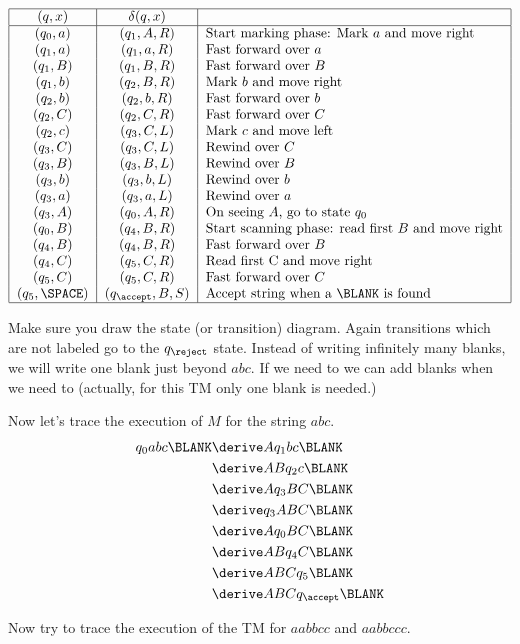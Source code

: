 \begin{eg}
\[
\begin{tabular}{|c|c|l|}
  \hline
  $(q,x)$ & $\delta(q,x)$ & \mbox{} \\
  \hline
  $(q_0,a)$ & $(q_1,A,R)$ & Start marking phase: Mark $a$ and move right \\
  $(q_1,a)$ & $(q_1,a,R)$ & Fast forward over $a$ \\
  $(q_1,B)$ & $(q_1,B,R)$ & Fast forward over $B$ \\
  $(q_1,b)$ & $(q_2,B,R)$ & Mark $b$ and move right \\
  $(q_2,b)$ & $(q_2,b,R)$ & Fast forward over $b$ \\
  $(q_2,C)$ & $(q_2,C,R)$ & Fast forward over $C$ \\
  $(q_2,c)$ & $(q_3,C,L)$ & Mark $c$ and move left \\
  $(q_3,C)$ & $(q_3,C,L)$ & Rewind over $C$ \\
  $(q_3,B)$ & $(q_3,B,L)$ & Rewind over $B$ \\
  $(q_3,b)$ & $(q_3,b,L)$ & Rewind over $b$ \\
  $(q_3,a)$ & $(q_3,a,L)$ & Rewind over $a$ \\
  $(q_3,A)$ & $(q_0,A,R)$ & On seeing $A$, go to state $q_0$\\
  $(q_0,B)$ & $(q_4,B,R)$ & Start scanning phase: read first $B$ and move right\\
  $(q_4,B)$ & $(q_4,B,R)$ & Fast forward over $B$ \\
  $(q_4,C)$ & $(q_5,C,R)$ & Read first C and move right\\
  $(q_5,C)$ & $(q_5,C,R)$ & Fast forward over $C$\\
  $(q_5,\SPACE)$ & $(q_{\accept},B,S)$ & Accept string when a $\BLANK$ is found\\
  \hline
\end{tabular}
\]

Make sure you draw the state (or transition) diagram. Again
transitions which are not labeled go to the $q_{\reject}$ state.
Instead of writing infinitely many blanks, we will write one blank
just beyond $abc$. If we need to we can add blanks when we need to
(actually, for this TM only one blank is needed.)

Now let's trace the execution of $M$ for the string $abc$.
\begin{align*}
q_0 abc\BLANK
 &\derive Aq_1bc \BLANK \\
 &\derive ABq_2c\BLANK \\
 &\derive Aq_3BC\BLANK \\
 &\derive q_3ABC\BLANK \\
 &\derive Aq_0BC\BLANK \\
 &\derive ABq_4C\BLANK \\
 &\derive ABCq_5\BLANK \\
 &\derive ABCq_{\accept}\BLANK \\
\end{align*}

Now try to trace the execution of the TM for $aabbcc$ and
$aabbccc$.
\end{eg}

